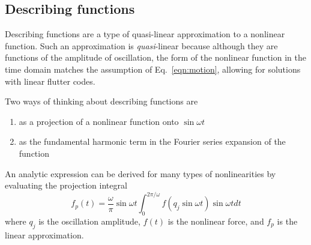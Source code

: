 \documentclass[11pt,openany,twoside]{book}
\numberwithin{equation}{section}		%
\newcommand{\Matrix}[1]{\boldsymbol{#1}}
\newcommand{\Vector}[1]{\boldsymbol{#1}}
\newcommand{\Eqn}[1]{Eq.\ \ref{#1}}  %
\begin{document}

\subsection{Describing functions}\label{sect:desc-fun}
Describing functions are a type of quasi-linear approximation to a
nonlinear function. Such an approximation is {\em quasi}-linear because
although they are functions of the amplitude of oscillation, the 
form of the nonlinear function in the time domain matches the
assumption of \Eqn{eqn:motion}, allowing for solutions with linear
flutter codes.

Two ways of thinking about describing functions are
\begin{enumerate}
	\item as a projection of a nonlinear function onto $\sin \omega t$
	\item as the fundamental harmonic term in the Fourier series
			expansion of the function
\end{enumerate}

An analytic expression can be derived for
many types of nonlinearities by evaluating the projection integral
\begin{equation}\label{eqn:df-defn}
f_{p} (t) = \frac{\omega}{\pi} \sin \omega t
	\int_{0}^{2\pi/\omega} f(q_j \sin \omega t) \sin \omega t dt
\end{equation}
where $q_j$ is the oscillation amplitude, $f(t)$ is the nonlinear force,
and $f_p$ is the linear approximation.
\end{document}
